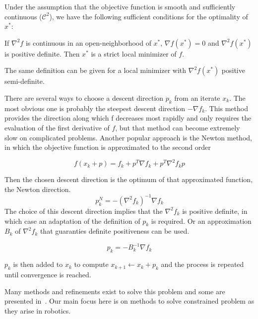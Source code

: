 Under the assumption that the objective function is smooth and sufficiently continuous ($\mathcal{C}^2$), we have the following sufficient conditions for the optimality of $x^*$:

\begin{theorem}
  If $\nabla^2f$ is continuous in an open-neighborhood of $x^*$, $\nabla f(x^*)=0$ and $\nabla^2 f(x^*)$ is positive definite.
  Then $x^*$ is a strict local minimizer of $f$.
\label{optimalityTheorem}
\end{theorem}

The same definition can be given for a local minimizer with $\nabla^2f(x^*)$ positive semi-definite.

There are several ways to choose a descent direction $p_k$ from an iterate $x_k$. The
most obvious one is probably the steepest descent direction $-\nabla f_k$. This
method provides the direction along which f decreases most rapidly and only
requires the evaluation of the first derivative of $f$, but that method can
become extremely slow on complicated problems. Another popular approach is the
Newton method, in which the objective function is approximated to the second
order

\begin{equation}
  f(x_k+p) = f_k + p^T\nabla f_k + p^T\nabla^2f_k p
\end{equation}

Then the chosen descent direction is the optimum of that approximated function,
the Newton direction.
\begin{equation}
  p^N_k = -{(\nabla^2 f_k)}^{-1} \nabla f_k
\end{equation}
The choice of this descent direction implies that the $\nabla^2f_k$ is positive
definite, in which case an adaptation of the definition of $p_k$ is required. Or
an approximation $B_k$ of $\nabla^2f_k$ that guaranties definite positiveness can be
used. %

\begin{equation}
  p_k = -B_k^{-1}\nabla f_k
\end{equation}

$p_k$ is then added to $x_k$ to compute $x_{k+1} \leftarrow x_k + p_k$ and the process is repeated until convergence is reached.

Many methods and refinements exist to solve this problem and some are presented in~\cite{nocedal:book:2006}.
Our main focus here is on methods to solve constrained problem as they arise in robotics.

